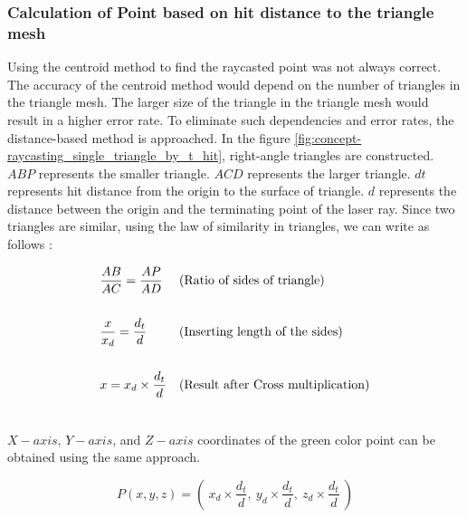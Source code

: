 \subsubsection{Calculation of Point based on hit distance to the triangle mesh}
Using the centroid method to find the raycasted point was not always correct. The accuracy of the centroid method would depend on the number of triangles in the triangle mesh. The larger size of the triangle in the triangle mesh would result in a higher error rate. To eliminate such dependencies and error rates, the distance-based method is approached.  
In the figure \ref{fig:concept-raycasting_single_triangle_by_t_hit}, right-angle triangles are constructed. \(ABP\) represents the smaller triangle. \(ACD\) represents the larger triangle. \(dt\) represents hit distance from the origin to the surface of triangle. \(d\) represents the distance between the origin and the terminating point of the laser ray. Since two triangles are similar, using the law of similarity in triangles, we can write as follows : 

\begin{gather*}
\begin{aligned}
&\frac{AB}{AC} = \frac{AP}{AD} && \text{(Ratio of sides of triangle)}\hfill \\ \\
&\frac{x}{x_d} = \frac{d_t}{d} && \text{(Inserting length of the sides)}\hfill \\  \\
&x = x_d \times \frac{d_t}{d} && \text{(Result after Cross multiplication)}\hfill  \\  \\
\end{aligned}
\end{gather*}

\(X-axis\), \(Y-axis\), and \(Z-axis\) coordinates of the green color point can be obtained using the same approach.

\begin{equation}\label{eq:find_xyz}
    P(x, y, z) = \left( \: x_d \times \frac{d_t}{d}, \: y_d \times \frac{d_t}{d}, \: z_d \times \frac{d_t}{d} \: \right)
\end{equation}



